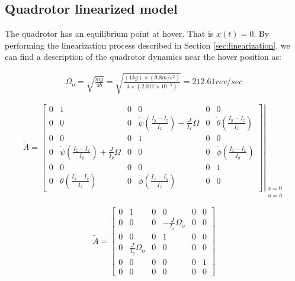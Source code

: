 \documentclass[12pt]{article}
\begin{document}
\subsection{Quadrotor linearized model}

The quadrotor has an equilibrium point at hover. That is $ x(t) = 0 $. By performing the linearization process described in Section \ref{sec:linearization}, we can find a description of the quadrotor dynamics near the hover position as:

\begin{equation}
  \begin{split}
    \Omega_o = \sqrt{\frac{mg}{4b}} = \sqrt{\frac{\left( 1 kg \right) \times \left( 9.8m/s^2 \right)}{4 \times \left (2.017\times 10^{-5} \right )}} = 212.61 rev/sec
  \end{split}
\end{equation}

$$ \tilde{A} = 
{\left. \begin{bmatrix}
0 & 1 & 0 & 0 & 0 & 0 \\ 
0 & 0 & 0 & \dot{\psi} \left (\frac{I_y - I_z}{I_x} \right ) - \frac{J}{I_x} \Omega & 0 & \dot{\theta} \left (\frac{I_y - I_z}{I_x} \right ) \\ 
0 & 0 & 0 & 1 & 0 & 0 \\ 
0 & \dot{\psi} \left (\frac{I_z - I_x}{I_y} \right ) + \frac{J}{I_y} \Omega & 0 & 0 & 0 & \dot{\phi} \left (\frac{I_z - I_x}{I_y} \right ) \\ 
0 & 0 & 0 & 0 & 0 & 1 \\ 
0 & \dot{\theta} \left (\frac{I_x - I_y}{I_z} \right ) & 0 & \dot{\phi} \left (\frac{I_x - I_y}{I_z} \right ) & 0 & 0
\end{bmatrix} \right |}_{\begin{smallmatrix} x = 0 \\ u = \bar{u} \end{smallmatrix}} $$

\begin{equation}
\tilde{A} = 
\begin{bmatrix}
0 & 1 & 0 & 0 & 0 & 0 \\ 
0 & 0 & 0 & -\frac{J}{I_x} \Omega_o & 0 & 0 \\ 
0 & 0 & 0 & 1 & 0 & 0 \\ 
0 & \frac{J}{I_y} \Omega_o & 0 & 0 & 0 & 0 \\ 
0 & 0 & 0 & 0 & 0 & 1 \\ 
0 & 0 & 0 & 0 & 0 & 0
\end{bmatrix}
\end{equation}
\end{document}
